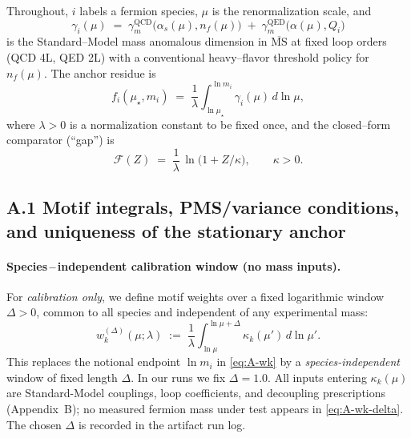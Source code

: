 \documentclass[epjc3]{svjour3}
\begin{document}
\noindent Throughout, $i$ labels a fermion species, $\mu$ is the renormalization scale, and
\begin{equation}
  \gamma_i(\mu)\;=\;\gamma^{\mathrm{QCD}}_m\!\bigl(\alpha_s(\mu),n_f(\mu)\bigr)\;+\;\gamma^{\mathrm{QED}}_m\!\bigl(\alpha(\mu),Q_i\bigr)
  \label{eq:A-gamma}
\end{equation}
is the Standard--Model mass anomalous dimension in $\overline{\mathrm{MS}}$ at fixed loop orders (QCD 4L, QED 2L) with a conventional heavy--flavor threshold policy for $n_f(\mu)$.
The anchor residue is
\begin{equation}
  f_i(\mu_\star,m_i)\;=\;\frac{1}{\lambda}\int_{\ln\mu_\star}^{\ln m_i}\gamma_i(\mu)\,d\ln\mu,
  \label{eq:A-res}
\end{equation}
where $\lambda>0$ is a normalization constant to be fixed once, and the closed--form comparator (``gap'') is
\begin{equation}
  \mathcal F(Z)\;=\;\frac{1}{\lambda}\,\ln\!\bigl(1+Z/\kappa\bigr),\qquad \kappa>0.
  \label{eq:A-gap}
\end{equation}

\subsection*{A.1 Motif integrals, PMS/variance conditions, and uniqueness of the stationary anchor}

\paragraph{Species\,–\,independent calibration window (no mass inputs).}
For \emph{calibration only}, we define motif weights over a fixed logarithmic window \(\Delta>0\), common to all species and independent of any experimental mass:
\begin{equation}
  w_k^{(\Delta)}(\mu;\lambda)
  \;:=\; \frac{1}{\lambda}\int_{\ln\mu}^{\ln\mu+\Delta}\!\kappa_k(\mu')\,d\ln\mu'.
  \label{eq:A-wk-delta}
\end{equation}
This replaces the notional endpoint \(\ln m_i\) in \eqref{eq:A-wk} by a \emph{species-independent} window of fixed length \(\Delta\). In our runs we fix \(\Delta=1.0\). All inputs entering \(\kappa_k(\mu)\) are Standard-Model couplings, loop coefficients, and decoupling prescriptions (Appendix~B); no measured fermion mass under test appears in \eqref{eq:A-wk-delta}. The chosen \(\Delta\) is recorded in the artifact run log.
\end{document}
